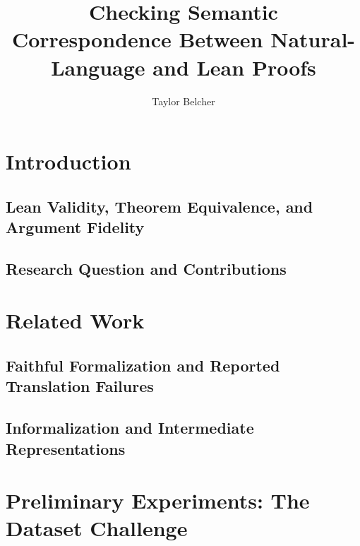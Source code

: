\documentclass[sigconf,nonacm]{acmart}
\title{Checking Semantic Correspondence Between Natural-Language and Lean Proofs}
\author{Taylor Belcher}
\newcommand{\draftspace}{\mbox{}\par\smallskip}
\begin{document}
\begin{abstract}
\end{abstract}
\maketitle

\section{Introduction}
\subsection{Lean Validity, Theorem Equivalence, and Argument Fidelity}
\draftspace
\subsection{Research Question and Contributions}
\draftspace

\section{Related Work}
\subsection{Faithful Formalization and Reported Translation Failures}
\draftspace
\subsection{Informalization and Intermediate Representations}
\draftspace

\section{Preliminary Experiments: The Dataset Challenge}
\end{document}
